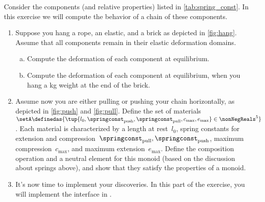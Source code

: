\begin{gradedexercise}
    \label{ex:Goldberg}
    Consider the components (and relative properties) listed in \cref{tab:spring_const}.
    In this exercise we will compute the behavior of a chain of these components.
    \begin{enumerate}
        \item Suppose you hang a rope, an elastic, and a brick as depicted in \cref{fig:hang}.
              Assume that all components remain in their elastic deformation domains.
              \begin{enumerate}[(a)]
                  \item Compute the deformation of each component at equilibrium.
                  \item Compute the deformation of each component at equilibrium, when you hang a \unit[1]{kg} weight at the end of the brick.
              \end{enumerate}
        \item Assume now you are either pulling or pushing your chain horizontally, as depicted in \cref{fig:push} and \cref{fig:pull}.
              Define the set of materials~$\setA\definedas \{ \tup{l_0, \springconst_\mathrm{push},\springconst_\mathrm{pull}, c_\mathrm{max}, e_\mathrm{max}} \in \nonNegReals^5\}$.
              Each material is characterized by a length at rest~$l_0$, spring constants for extension and compression~$\springconst_\mathrm{pull}, \springconst_\mathrm{push}$, maximum compression~$c_\mathrm{max}$, and maximum extension~$e_\mathrm{max}$.
              Define the composition operation and a neutral element for this monoid (based on the discussion about springs above), and show that they satisfy the properties of a monoid.
        \item It's now time to implement your discoveries.
              In this part of the exercise, you will implement the interface in .


\end{enumerate}
\end{gradedexercise}
